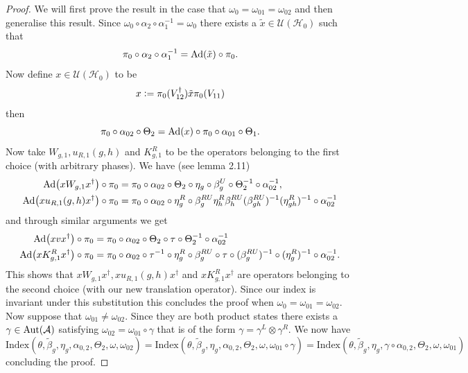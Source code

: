 \documentclass[12pt,a4paper,twoside]{article}
\newcommand{\defeq}{\vcentcolon=}
\let\originalleft\left
\let\originalright\right
\renewcommand{\left}{\mathopen{}\mathclose\bgroup\originalleft}
\renewcommand{\right}{\aftergroup\egroup\originalright}
\newcommand{\UU}{\mathcal U}
\newcommand{\HH}{\mathcal H}
\renewcommand{\AA}{\mathcal A}
\newcommand{\Ad}[1]{\textrm{Ad}\left(#1\right)}
\newcommand{\Aut}[1]{\textrm{Aut}\left(#1\right)}
\theoremstyle{definition}
\numberwithin{equation}{section}
\begin{document}
\begin{proof}
	We will first prove the result in the case that $\omega_0=\omega_{01}=\omega_{02}$ and then generalise this result. Since $\omega_0\circ\alpha_2\circ\alpha_1^{-1}=\omega_0$ there exists a $\tilde{x}\in\UU(\HH_0)$ such that
	\begin{equation}
		\pi_0\circ\alpha_2\circ\alpha_1^{-1}=\Ad{\tilde{x}}\circ\pi_0.
	\end{equation}
	Now define $x\in\UU(\HH_0)$ to be
	\begin{equation}
		x\defeq \pi_0(V_{12}^\dagger)\tilde{x} \pi_0(V_{11})
	\end{equation}
	then
	\begin{equation}
		\pi_0\circ\alpha_{02}\circ\Theta_2=\Ad{x}\circ\pi_0\circ\alpha_{01}\circ\Theta_1.
	\end{equation}
	Now take $W_{g,1},u_{R,1}(g,h)$ and $K^R_{g,1}$ to be the operators belonging to the first choice (with arbitrary phases). 
	We have (see \cite{ogata2021h3gmathbb} lemma 2.11)
	\begin{align}
		\Ad{xW_{g,1}x^\dagger}\circ\pi_0&=\pi_0\circ \alpha_{02}\circ\Theta_2\circ\eta_g\circ\beta_g^U\circ\Theta_2^{-1}\circ\alpha_{02}^{-1},\\
		\Ad{xu_{R,1}(g,h)x^\dagger}\circ\pi_0&=\pi_0\circ \alpha_{02}\circ\eta_g^R\circ\beta_g^{RU}\eta_h^R\beta_{h}^{RU}(\beta_{gh}^{RU})^{-1}(\eta_{gh}^R)^{-1}\circ\alpha_{02}^{-1}
	\end{align}
	and through similar arguments we get
	\begin{align}
		\Ad{xvx^\dagger}\circ\pi_0&=\pi_0\circ\alpha_{02}\circ\Theta_2\circ\tau\circ\Theta_2^{-1}\circ\alpha_{02}^{-1}\\
		\Ad{xK^R_{g,1}x^\dagger}\circ\pi_0&=\pi_0\circ \alpha_{02}\circ\tau^{-1}\circ\eta_g^R\circ\beta_g^{RU}\circ\tau\circ(\beta_g^{RU})^{-1}\circ(\eta^R_g)^{-1}\circ\alpha_{02}^{-1}.
	\end{align}
	This shows that $xW_{g,1}x^\dagger,xu_{R,1}(g,h)x^\dagger$ and $xK^R_{g,1}x^\dagger$ are operators belonging to the second choice (with our new translation operator). Since our index is invariant under this substitution this concludes the proof when $\omega_0=\omega_{01}=\omega_{02}$. Now suppose that $\omega_{01}\neq\omega_{02}$. Since they are both product states there exists a $\gamma\in\Aut{\AA}$ satisfying $\omega_{02}=\omega_{01}\circ\gamma$ that is of the form $\gamma=\gamma^L\otimes\gamma^R$. We now have
	\begin{equation}
		\textrm{Index}(\theta,\tilde{\beta}_g,\eta_g,\alpha_{0,2},\Theta_2,\omega,\omega_{02})=\textrm{Index}(\theta,\tilde{\beta}_g,\eta_g,\alpha_{0,2},\Theta_2,\omega,\omega_{01}\circ\gamma)=\textrm{Index}(\theta,\tilde{\beta}_g,\eta_g,\gamma\circ\alpha_{0,2},\Theta_2,\omega,\omega_{01})
	\end{equation}
	concluding the proof.
\end{proof}
\end{document}
